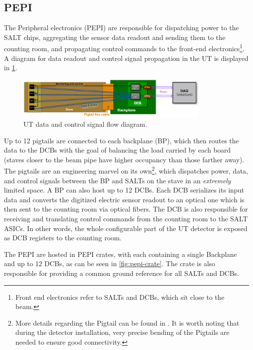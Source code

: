 \subsection{PEPI}
\label{ref:ut:overview:pepi}

The Peripheral electronics (PEPI) are responsible for dispatching power to
the SALT chips,
aggregating the sensor data readout and sending them to the counting room,
and propagating control commands to the front-end electronics\footnote{
    Front end electronics refer to SALTs and DCBs, which sit close to the beam.
}.
A diagram for data readout and control signal propagation in the UT is displayed
in
\cref{fig:ut-readout-diagram}.

\begin{figure}[!htb]
    \centering
    \includegraphics[width=0.85\textwidth]{./figs-ut-upgrade/detector/ut_data_control_flow.pdf}
    \caption{
        UT data and control signal flow diagram.
    }
    \label{fig:ut-readout-diagram}
\end{figure}

Up to 12 pigtails are connected to each backplane (BP),
which then routes the data to the DCBs with the goal of balancing the load
carried by each board (staves closer to the beam pipe have higher occupancy than
those farther away).
The pigtails are an engineering marvel on its own\footnote{
    More details regarding the Pigtail can be found in
    \cite{Andrews:2018vla}.
    It is worth noting that during the detector installation,
    very precise bending of the Pigtails are needed to ensure good connectivity.
},
which dispatches power, data, and control signals between the BP and SALTs on
the stave in an \emph{extremely} limited space.
A BP can also host up to 12 DCBs.
Each DCB serializes its input data and converts the digitized electric sensor
readout to an optical one which is then sent to the counting room via optical
fibers.
The DCB is also responsible for receiving and translating control commands from
the counting room to the SALT ASICs.
In other words, the whole configurable part of the UT detector is exposed as DCB
registers to the counting room.

The PEPI are hosted in PEPI crates, with each containing a single Backplane and
up to 12 DCBs,
as can be seen in \cref{fig:pepi-crate}.
The crate is also responsible for providing a common ground reference for all
SALTs and DCBs.

